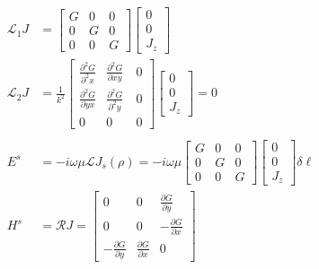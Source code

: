 \documentclass{article}
\newcommand{\0}{\varnothing}
\begin{document}
\begin{minipage}{0.5\textwidth}
\begin{align*}
    \mathcal{L}_1 J &= 
    \left[ \begin{array}{ccc} G & 0 & 0 \\ 
                            0 & G & 0\\ 
                            0 & 0 & G \end{array} \right]
        \left[ \begin{array}{c} 
        0 \\ 0 \\ J_z \end{array} \right]\\
    \mathcal{L}_2 J &= \frac{1}{k^2} \left[ \begin{array}{ccc} \frac{\partial^2 G }{\partial^2 x} & \frac{\partial^2 G }{\partial xy}\ & 0 \\ 
                            \frac{\partial^2 G}{\partial yx} & \frac{\partial^2 G}{\partial^2 y} &0\\ 
                            0 & 0 &0 \end{array} \right]
                                    \left[ \begin{array}{c} 
                            0 \\ 0 \\ J_z \end{array} \right] = 0\\
    \ \\
    E^s &= -i\omega\mu \mathcal{L} J_s(\rho) = -i\omega\mu \left[ \begin{array}{ccc} G & 0 & 0 \\ 
                            0 & G & 0\\ 
                            0 & 0 & G \end{array} \right]
        \left[ \begin{array}{c} 
        0 \\ 0 \\ J_z \end{array} \right] \delta \ell\\
         H^s &= \mathcal{R} J = \left[ \begin{array}{ccc} 0 & 0 & \frac{\partial G}{\partial y}\\ 
                            0 & 0 &-\frac{\partial G}{\partial x}\\ 
                            -\frac{\partial G}{\partial y} &\frac{\partial G}{\partial x} &0 \end{array} \right]

\end{align*}
\end{minipage}
\end{document}

